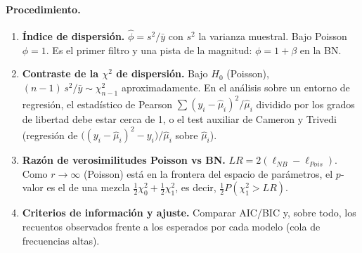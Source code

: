 \documentclass[a4paper,12pt]{article}
\begin{document}
\paragraph{Procedimiento.}
\begin{enumerate}[leftmargin=*,itemsep=2pt]
\item \textbf{\'Indice de dispersi\'on.} $\hat\phi=s^2/\bar y$ con $s^2$ la varianza muestral. Bajo Poisson $\phi=1$. Es el primer filtro y una pista de la magnitud: $\phi=1+\beta$ en la BN.
\item \textbf{Contraste de la $\chi^2$ de dispersi\'on.} Bajo $H_0$ (Poisson), $(n-1)\,s^2/\bar y\sim\chi^2_{n-1}$ aproximadamente. En el an\'alisis sobre un entorno de regresi\'on, el estad\'istico de Pearson $\sum(y_i-\hat\mu_i)^2/\hat\mu_i$ dividido por los grados de libertad debe estar cerca de 1, o el test auxiliar de Cameron y Trivedi (regresi\'on de $\big((y_i-\hat\mu_i)^2-y_i\big)/\hat\mu_i$ sobre $\hat\mu_i$).
\item \textbf{Raz\'on de verosimilitudes Poisson vs BN.} $LR=2(\ell_{NB}-\ell_{Pois})$. Como $r\to\infty$ (Poisson) est\'a en la frontera del espacio de par\'ametros, el $p$-valor es el de una mezcla $\tfrac12\chi^2_0+\tfrac12\chi^2_1$, es decir, $\tfrac12P(\chi^2_1>LR)$.
\item \textbf{Criterios de informaci\'on y ajuste.} Comparar AIC/BIC y, sobre todo, los recuentos observados frente a los esperados por cada modelo (cola de frecuencias altas).
\end{enumerate}
\end{document}

